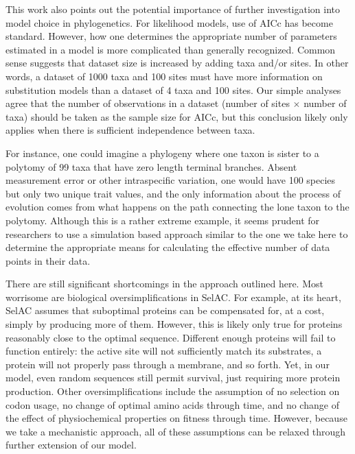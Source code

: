 \documentclass[12pt,letterpaper,fleqn]{article}
\newcommand{\selac}{SelAC\xspace}
\begin{document}
This work also points out the potential importance of further investigation into model choice in phylogenetics. 
For likelihood models, use of AICc has become standard. 
However, how one determines the appropriate number of parameters estimated in a model is more complicated than generally recognized. 
Common sense suggests that dataset size is increased by adding taxa and/or sites. 
In other words, a dataset of 1000 taxa and 100 sites must have more information on substitution models than a dataset of 4 taxa and 100 sites. 
Our simple analyses agree that the number of observations in a dataset (number of sites $\times$ number of taxa) should be taken as the sample size for AICc, but this conclusion likely only applies when there is sufficient independence between taxa. 

For instance, one could imagine a phylogeny where one taxon is sister to a polytomy of 99 taxa that have zero length terminal branches. 
Absent measurement error or other intraspecific variation, one would have 100 species but only two unique trait values, and the only information about the process of evolution comes from what happens on the path connecting the lone taxon to the polytomy. 
Although this is a rather extreme example, it seems prudent for researchers to use a simulation based approach similar to the one we take here to determine the appropriate means for calculating the effective number of data points in their data.

There are still significant shortcomings in the approach outlined here. 
Most worrisome are biological oversimplifications in \selac.
For example, at its heart, \selac assumes that suboptimal proteins can be compensated for, at a cost, simply by producing more of them. 
However, this is likely only true for proteins reasonably close to the optimal sequence. 
Different enough proteins will fail to function entirely: the active site will not sufficiently match its substrates, a protein will not properly pass through a membrane, and so forth. 
Yet, in our model, even random sequences still permit survival, just requiring more protein production. 
Other oversimplifications include the assumption of no selection on codon usage, no change of optimal amino acids through time, and no change of the effect of physiochemical properties on fitness through time.
However, because we take a mechanistic approach, all of these assumptions can be relaxed through further extension of our model. 
\end{document}
